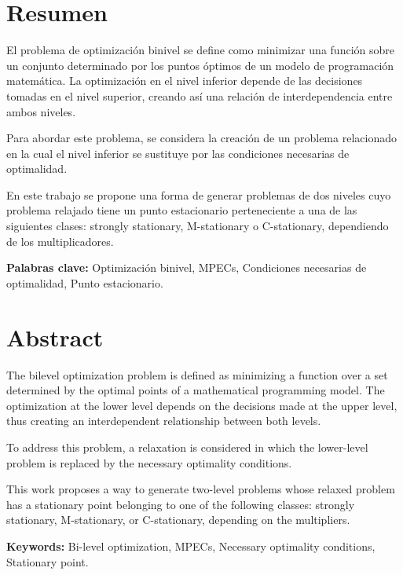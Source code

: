 \chapter*{Resumen}

El problema de optimización binivel se define como minimizar una función sobre un conjunto determinado por los puntos óptimos de un modelo de programación matemática. La optimización en el nivel inferior depende de las decisiones tomadas en el nivel superior, creando así una relación de interdependencia entre ambos niveles.

Para abordar este problema, se considera la creación de un problema relacionado en la cual el nivel inferior se sustituye por las condiciones necesarias de optimalidad.

En este trabajo se propone una forma de generar problemas de dos niveles cuyo problema relajado tiene un punto estacionario perteneciente a una de las siguientes clases: strongly stationary, M-stationary o C-stationary, dependiendo de los multiplicadores.


\textbf{Palabras clave:} Optimización binivel, MPECs, Condiciones necesarias de optimalidad, Punto estacionario.

\chapter*{Abstract}
The bilevel optimization problem is defined as minimizing a function over a set determined by the optimal points of a mathematical programming model. The optimization at the lower level depends on the decisions made at the upper level, thus creating an interdependent relationship between both levels.

To address this problem, a relaxation is considered in which the lower-level problem is replaced by the necessary optimality conditions.

This work proposes a way to generate two-level problems whose relaxed problem has a stationary point belonging to one of the following classes: strongly stationary, M-stationary, or C-stationary, depending on the multipliers.

\textbf{Keywords:} Bi-level optimization, MPECs, Necessary optimality conditions, Stationary point.
